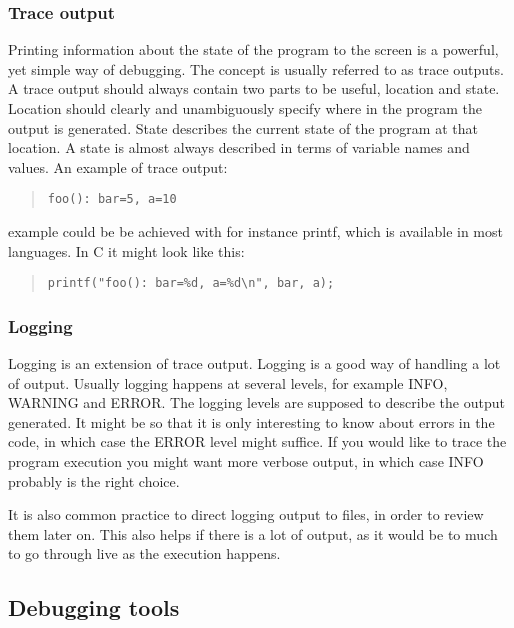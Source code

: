 \documentclass[11pt,a4paper,twoside]{article}
\begin{document}
\subsubsection{Trace output}

Printing information about the state of the program to the screen is a
powerful, yet simple way of debugging. The concept is usually referred to as
trace outputs. A trace output should always contain two parts to be useful,
location and state. Location should clearly and unambiguously specify where in
the program the output is generated. State describes the current state of the
program at that location. A state is almost always described in terms of
variable names and values. An example of trace output:

\begin{quote}
\begin{verbatim}
foo(): bar=5, a=10
\end{verbatim}
\end{quote}

 example could be be achieved with for instance printf, which is available
in most languages. In C it might look like this:

\begin{quote}
\begin{verbatim}
printf("foo(): bar=%d, a=%d\n", bar, a);
\end{verbatim}
\end{quote}


\subsubsection{Logging}

Logging is an extension of trace output. Logging is a good way of handling a
lot of output. Usually logging happens at several levels, for example
\textsc{INFO}, \textsc{WARNING} and \textsc{ERROR}. The logging levels are
supposed to describe the output generated. It might be so that it is only
interesting to know about errors in the code, in which case the \textsc{ERROR}
level might suffice. If you would like to trace the program execution you might
want more verbose output, in which case \textsc{INFO} probably is the right
choice. 

It is also common practice to direct logging output to files, in order to
review them later on. This also helps if there is a lot of output, as it would
be to much to go through live as the execution happens.

\subsection{Debugging tools}
\end{document}
